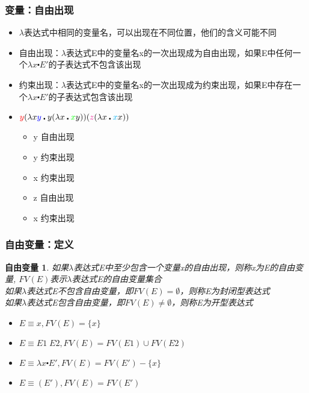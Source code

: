\documentclass[CJKutf8,compress,hyperref]{beamer}
\begin{document}
\begin{CJK}{UTF8}{song}
\begin{frame} 
  \frametitle{变量：自由出现}  
  \begin{itemize}
  \item $\lambda$表达式中相同的变量名，可以出现在不同位置，他们的含义可能不同
  \item 自由出现：$\lambda$表达式E中的变量名x的一次出现成为自由出现，如果E中任何一个$\lambda x \centerdot E'$的子表达式不包含该出现 
  \item 约束出现：$\lambda$表达式E中的变量名x的一次出现成为约束出现，如果E中存在一个$\lambda x \centerdot E'$的子表达式包含该出现 
  \item ${\color{red}y}(\lambda x {\color{blue}y} \centerdot
    y (\lambda x \centerdot {\color{green}x}y))
    ({\color{magenta}z} (\lambda x \centerdot {\color{cyan}x}x))$ 
    \begin{itemize} 
    \item {\color{red}y} 自由出现
    \item {\color{blue}y} 约束出现 
    \item {\color{green}x} 约束出现 
    \item {\color{magenta}z} 自由出现 
    \item {\color{cyan}x} 约束出现 
    \end{itemize} 
  \end{itemize}  
\end{frame}

\begin{frame}
  \frametitle{自由变量：定义} 
  \newtheorem{fv}{自由变量} 
  \begin{fv}
    如果$\lambda$表达式E中至少包含一个变量x的自由出现，则称x为E的{\color{red}自由变量}, $FV(E)$表示$\lambda$表达式E的自由变量集合 \\ 
    如果$\lambda$表达式E不包含自由变量，即$FV(E) = \emptyset$，则称E为封闭型表达式\\ 
    如果$\lambda$表达式E包含自由变量，即$FV(E) \neq \emptyset$，则称E为开型表达式
  \end{fv} 
  \begin{itemize}
  \item  
    $E \equiv x , FV(E) = \{ x \}$
  \item       
    $E \equiv E1 \; E2,  FV(E) =  FV(E1) \cup FV(E2) $    
  \item
    $E \equiv \lambda x \centerdot E',  FV(E) =  FV(E')
    -\{ x \}     $
  \item
    $E \equiv (E'), FV(E) =  FV(E') $
  \end{itemize}
\end{frame}


\end{CJK}
\end{document}
